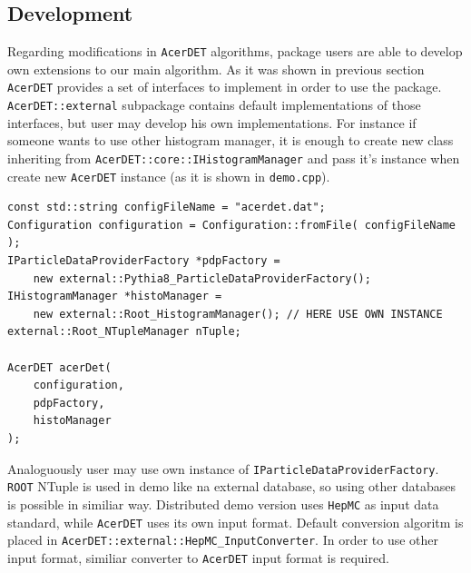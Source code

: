 \subsection{Development}

Regarding modifications in {\tt AcerDET} algorithms, package users are able to 
develop own extensions to our main algorithm. As it was shown in previous section 
{\tt AcerDET} provides a set of interfaces to implement in order to use the package.
{\tt AcerDET::external} subpackage contains default implementations of those interfaces, 
but user may develop his own implementations. For instance if someone wants to use 
other histogram manager, it is enough to create new class inheriting from 
{\tt AcerDET::core::IHistogramManager} and pass it's instance when create new {\tt AcerDET} 
instance (as it is shown in {\tt demo.cpp}).

{\scriptsize
\begin{verbatim}  
const std::string configFileName = "acerdet.dat";
Configuration configuration = Configuration::fromFile( configFileName );
IParticleDataProviderFactory *pdpFactory =
	new external::Pythia8_ParticleDataProviderFactory();
IHistogramManager *histoManager =
	new external::Root_HistogramManager(); // HERE USE OWN INSTANCE
external::Root_NTupleManager nTuple;

AcerDET acerDet(
	configuration,
	pdpFactory,
	histoManager 
);
\end{verbatim} 
}

Analoguously user may use own instance of {\tt IParticleDataProviderFactory}.
{\tt ROOT} NTuple is used in demo like na external database, so using other 
databases is possible in similiar way.
Distributed demo version uses {\tt HepMC} as input data standard, while 
{\tt AcerDET} uses its own input format. Default conversion algoritm is 
placed in {\tt AcerDET::external::HepMC\_InputConverter}. In order to use 
other input format, similiar converter to {\tt AcerDET} input format is required.


\newpage
